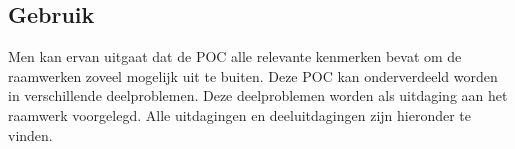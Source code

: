 
\subsection{Gebruik}
\label{sec:vergelijking-gebruik}

Men kan ervan uitgaat dat de POC alle relevante kenmerken bevat om de raamwerken zoveel mogelijk uit te buiten. 
Deze POC kan onderverdeeld worden in verschillende deelproblemen.
Deze deelproblemen worden als uitdaging aan het raamwerk voorgelegd.
Alle uitdagingen en deeluitdagingen zijn hieronder te vinden.

{}

